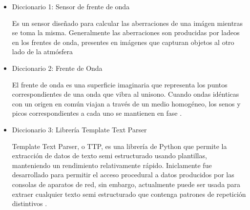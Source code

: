 \begin{itemize}
    \item Diccionario 1: Sensor de frente de onda

    Es un sensor diseñado para calcular las aberraciones de una imágen mientras se toma la misma. Generalmente las aberraciones son producidas por ladeos en los frentes de onda, presentes en imágenes que capturan objetos al otro lado de la atmósfera \cite{platt2001sh}

    \item Diccionario 2: Frente de Onda

    El frente de onda es una superficie imaginaria que representa los puntos correspondientes de una onda que vibra al unisono. Cuando ondas idénticas con un origen en común viajan a través de un medio homogéneo, los senos y picos correspondientes a cada uno se mantienen en fase \cite{britannica2022front}. 

     \item Diccionario 3: Librería Template Text Parser

     Template Text Parser, o TTP, es una librería de Python que permite la extracción de datos de texto semi estructurado usando plantillas, manteniendo un rendimiento relativamente rápido. Iniclamente fue desarrollado para permitir el acceso procedural a datos producidos por las consolas de aparatos de red, sin embargo, actualmente puede ser usada para extraer cualquier texto semi estructurado que contenga patrones de repetición distintivos \cite{dmulyalin2021ttp}.
\end{itemize}